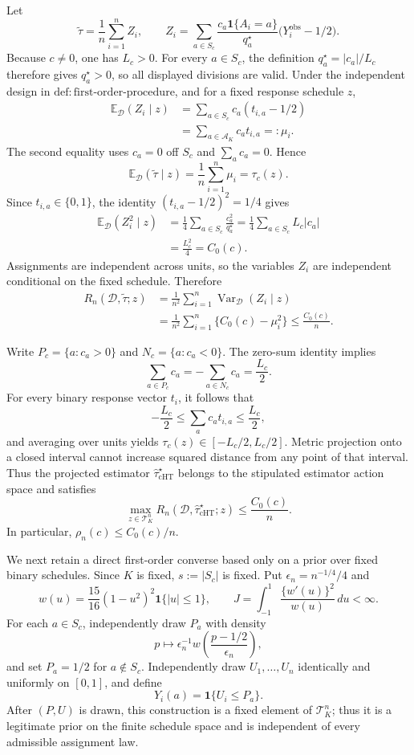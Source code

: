 Let
\[
 \widetilde\tau=\frac1n\sum_{i=1}^n Z_i,
 \qquad
 Z_i=\sum_{a\in S_c}
 \frac{c_a\mathbf 1\{A_i=a\}}{q_a^\star}
 \bigl(Y_i^{\mathrm{obs}}-1/2\bigr).
\]
Because \(c\neq0\), one has \(L_c>0\).  For every \(a\in S_c\), the definition \(q_a^\star=|c_a|/L_c\) therefore gives \(q_a^\star>0\), so all displayed divisions are valid.  Under the independent design in \(\mathrm{def:first\text{-}order\text{-}procedure}\), and for a fixed response schedule \(z\),
\[
 \begin{aligned}
 \mathbb E_{\mathcal D}(Z_i\mid z)
 &=\sum_{a\in S_c}c_a(t_{i,a}-1/2)\\
 &=\sum_{a\in\mathcal A_K}c_at_{i,a}=:\mu_i.
 \end{aligned}
\]
The second equality uses \(c_a=0\) off \(S_c\) and \(\sum_a c_a=0\).  Hence
\[
 \mathbb E_{\mathcal D}(\widetilde\tau\mid z)
 =\frac1n\sum_{i=1}^n\mu_i=\tau_c(z).
\]
Since \(t_{i,a}\in\{0,1\}\), the identity \((t_{i,a}-1/2)^2=1/4\) gives
\[
 \begin{aligned}
 \mathbb E_{\mathcal D}(Z_i^2\mid z)
 &=\frac14\sum_{a\in S_c}\frac{c_a^2}{q_a^\star}
 =\frac14\sum_{a\in S_c}L_c|c_a|\\
 &=\frac{L_c^2}{4}=C_0(c).
 \end{aligned}
\]
Assignments are independent across units, so the variables \(Z_i\) are independent conditional on the fixed schedule.  Therefore
\[
 \begin{aligned}
 R_n(\mathcal D,\widetilde\tau;z)
 &=\frac1{n^2}\sum_{i=1}^n
 \operatorname{Var}_{\mathcal D}(Z_i\mid z)\\
 &=\frac1{n^2}\sum_{i=1}^n\{C_0(c)-\mu_i^2\}
 \leq\frac{C_0(c)}n.
 \end{aligned}
\]

Write \(P_c=\{a:c_a>0\}\) and \(N_c=\{a:c_a<0\}\).  The zero-sum identity implies
\[
 \sum_{a\in P_c}c_a
 =-\sum_{a\in N_c}c_a=\frac{L_c}{2}.
\]
For every binary response vector \(t_i\), it follows that
\[
 -\frac{L_c}{2}\leq\sum_a c_at_{i,a}\leq\frac{L_c}{2},
\]
and averaging over units yields \(\tau_c(z)\in[-L_c/2,L_c/2]\).  Metric projection onto a closed interval cannot increase squared distance from any point of that interval.  Thus the projected estimator \(\widehat\tau_{\mathrm{cHT}}^\star\) belongs to the stipulated estimator action space and satisfies
\[
 \max_{z\in\mathcal T_K^n}
 R_n(\mathcal D,\widehat\tau_{\mathrm{cHT}}^\star;z)
 \leq\frac{C_0(c)}n.
\]
In particular, \(\rho_n(c)\leq C_0(c)/n\).

We next retain a direct first-order converse based only on a prior over fixed binary schedules.  Since \(K\) is fixed, \(s:=|S_c|\) is fixed.  Put \(\epsilon_n=n^{-1/4}/4\) and
\[
 w(u)=\frac{15}{16}(1-u^2)^2\mathbf 1\{|u|\leq1\},
 \qquad
 J=\int_{-1}^1\frac{\{w'(u)\}^2}{w(u)}\,du<\infty.
\]
For each \(a\in S_c\), independently draw \(P_a\) with density
\[
 p\longmapsto\epsilon_n^{-1}w\!\left(\frac{p-1/2}{\epsilon_n}\right),
\]
and set \(P_a=1/2\) for \(a\notin S_c\).  Independently draw \(U_1,\ldots,U_n\) identically and uniformly on \([0,1]\), and define
\[
 Y_i(a)=\mathbf 1\{U_i\leq P_a\}.
\]
After \((P,U)\) is drawn, this construction is a fixed element of \(\mathcal T_K^n\); thus it is a legitimate prior on the finite schedule space and is independent of every admissible assignment law.

